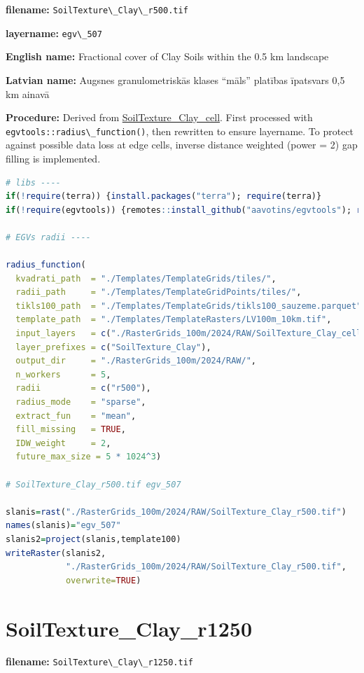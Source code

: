 \documentclass[
]{book}
\newcommand{\passthrough}[1]{#1}
\begin{document}
\textbf{filename:} \passthrough{\lstinline!SoilTexture\_Clay\_r500.tif!}

\textbf{layername:} \passthrough{\lstinline!egv\_507!}

\textbf{English name:} Fractional cover of Clay Soils within the 0.5 km landscape

\textbf{Latvian name:} Augsnes granulometriskās klases ``māls'' platības īpatsvars 0,5 km ainavā

\textbf{Procedure:} Derived from \hyperref[ch06.506]{SoilTexture\_Clay\_cell}. First processed
with \passthrough{\lstinline!egvtools::radius\_function()!}, then rewritten to ensure layername. To protect against
possible data loss at edge cells, inverse distance weighted (power = 2) gap filling
is implemented.

\begin{lstlisting}[language=R]
# libs ----
if(!require(terra)) {install.packages("terra"); require(terra)}
if(!require(egvtools)) {remotes::install_github("aavotins/egvtools"); require(egvtools)}

# EGVs radii ----

radius_function(
  kvadrati_path  = "./Templates/TemplateGrids/tiles/",
  radii_path     = "./Templates/TemplateGridPoints/tiles/",
  tikls100_path  = "./Templates/TemplateGrids/tikls100_sauzeme.parquet",
  template_path  = "./Templates/TemplateRasters/LV100m_10km.tif",
  input_layers   = c("./RasterGrids_100m/2024/RAW/SoilTexture_Clay_cell.tif"),
  layer_prefixes = c("SoilTexture_Clay"),
  output_dir     = "./RasterGrids_100m/2024/RAW/",
  n_workers      = 5,
  radii          = c("r500"),
  radius_mode    = "sparse",
  extract_fun    = "mean",
  fill_missing   = TRUE,
  IDW_weight     = 2,
  future_max_size = 5 * 1024^3)

# SoilTexture_Clay_r500.tif egv_507

slanis=rast("./RasterGrids_100m/2024/RAW/SoilTexture_Clay_r500.tif")
names(slanis)="egv_507"
slanis2=project(slanis,template100)
writeRaster(slanis2,
            "./RasterGrids_100m/2024/RAW/SoilTexture_Clay_r500.tif",
            overwrite=TRUE)
\end{lstlisting}

\section{SoilTexture\_Clay\_r1250}\label{ch06.508}

\textbf{filename:} \passthrough{\lstinline!SoilTexture\_Clay\_r1250.tif!}
\end{document}
